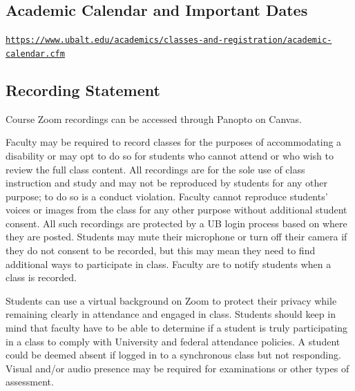 \documentclass[10pt]{article}
\begin{document}
\subsection{Academic Calendar and Important Dates}
\href{https://www.ubalt.edu/academics/classes-and-registration/academic-calendar.cfm}{\nolinkurl{https://www.ubalt.edu/academics/classes-and-registration/academic-calendar.cfm}}

\subsection{Recording Statement}
Course Zoom recordings can be accessed through Panopto on Canvas.

Faculty may be required to record classes for the purposes of accommodating a disability or may opt to do so for students who cannot attend or who wish to review the full class content. All recordings are for the sole use of class instruction and study and may not be reproduced by students for any other purpose; to do so is a conduct violation. Faculty cannot reproduce students' voices or images from the class for any other purpose without additional student consent. All such recordings are protected by a UB login process based on where they are posted. Students may mute their microphone or turn off their camera if they do not consent to be recorded, but this may mean they need to find additional ways to participate in class. Faculty are to notify students when a class is recorded.

Students can use a virtual background on Zoom to protect their privacy while remaining clearly in attendance and engaged in class. Students should keep in mind that faculty have to be able to determine if a student is truly participating in a class to comply with University and federal attendance policies. A student could be deemed absent if logged in to a synchronous class but not responding. Visual and/or audio presence may be required for examinations or other types of assessment.
\end{document}
